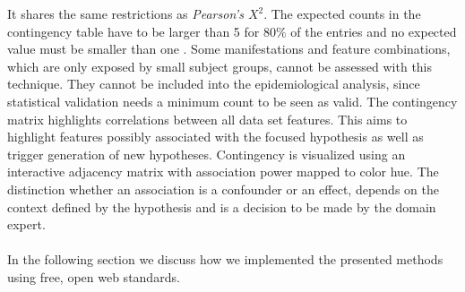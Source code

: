 \documentclass[journal]{style/vgtc} 			          %
\begin{document}
It shares the same restrictions as \emph{Pearson's $X^2$}.
%
The expected counts in the contingency table have to be larger than 5 for $80\%$ of the entries and no expected value must be smaller than one \cite{Cochran1952}.
%
Some manifestations and feature combinations, which are only exposed by small subject groups, cannot be assessed with this technique.
%
They cannot be included into the epidemiological analysis, since statistical validation needs a minimum count to be seen as valid.
The contingency matrix highlights correlations between all data set features. %
%
This aims to highlight features possibly associated with the focused hypothesis as well as trigger generation of new hypotheses.
%
Contingency is visualized using an interactive adjacency matrix with association power mapped to color hue.
%
The distinction whether an association is a confounder or an effect, depends on the context defined by the hypothesis and is a decision to be made by the domain expert.
\\\\
In the following section we discuss how we implemented the presented methods using free, open web standards.
% 
\end{document}
